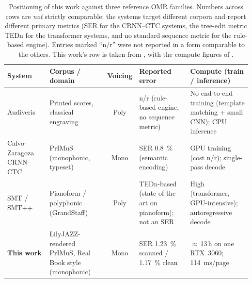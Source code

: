 \begin{table}[ht]
    \centering
    \caption{Positioning of this work against three reference OMR
    families.  Numbers across rows are \emph{not} strictly comparable:
    the systems target different corpora and report different primary
    metrics (SER for the CRNN--CTC systems, the tree-edit metric TEDn
    for the transformer systems, and no standard sequence metric for
    the rule-based engine).  Entries marked \enquote{n/r} were not
    reported in a form comparable to the others.  This work's row is
    taken from , with the compute figures of
    .}
    \label{tab:soa-comparison}
    \scriptsize
    \setlength{\tabcolsep}{4pt}
    \renewcommand{\arraystretch}{1.3}
    \begin{tabularx}{\linewidth}{@{} >{\raggedright\arraybackslash}p{2.4cm} L c L L @{}}
        \toprule
        \textbf{System} & \textbf{Corpus / domain} & \textbf{Voicing}
            & \textbf{Reported error} & \textbf{Compute (train / inference)} \\
        \midrule
        Audiveris~\cite{audiverisAudiveris}
            & Printed scores, classical engraving
            & Poly
            & n/r (rule-based engine, no sequence metric)
            & No end-to-end training (template matching + small CNN); CPU inference \\
        \tfgrowsep
        Calvo-Zaragoza CRNN--CTC~\cite{calvoZaragozaEndToEndNeural2018}
            & PrIMuS (monophonic, typeset)
            & Mono
            & SER \SI{0.8}{\percent} (semantic encoding)
            & GPU training (cost n/r); single-pass decode \\
        \tfgrowsep
        SMT / SMT++~\cite{riosVilaSheetMusicTransformer2024,riosVilaSMTPlusPlus2024}
            & Pianoform / polyphonic (GrandStaff)
            & Poly
            & TEDn-based (state of the art on pianoform); not an SER
            & High (transformer, GPU-intensive); autoregressive decode \\
        \tfgrowsep
        \textbf{This work}
            & LilyJAZZ-rendered PrIMuS, Real Book style (monophonic)
            & Mono
            & SER \SI{1.23}{\percent} scanned / \SI{1.17}{\percent} clean
            & $\approx$\,13\,h on one RTX~3060; \SI{114}{\milli\second}/page \\
        \bottomrule
    \end{tabularx}
\end{table}

